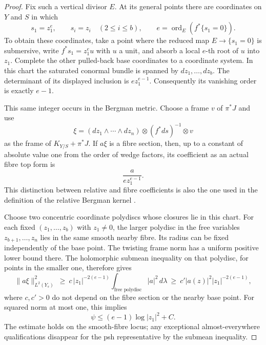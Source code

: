 \begin{proof}
Fix such a vertical divisor $E$.  At its general points there are
coordinates on $Y$ and $S$ in which
\begin{equation}\label{eq:h:slope:power-map}
 s_1=z_1^e,\qquad s_i=z_i\quad(2\leq i\leq b),
 \qquad e=\operatorname{ord}_E(f^*\{s_1=0\}).
\end{equation}
To obtain these coordinates, take a point where the reduced map
$E\to\{s_1=0\}$ is submersive, write $f^*s_1=z_1^e u$ with $u$ a
unit, and absorb a local $e$-th root of $u$ into $z_1$.  Complete the
other pulled-back base coordinates to a coordinate system.  In this
chart the saturated conormal bundle is spanned by
$dz_1,\ldots,dz_b$.  The determinant of its displayed inclusion is
$e z_1^{e-1}$.  Consequently its vanishing order is exactly $e-1$.

This same integer occurs in the Bergman metric.  Choose a frame $v$
of $\pi^*J$ and use
\[
  \xi=(dz_1\wedge\cdots\wedge dz_n)\otimes(f^*ds)^{-1}\otimes v
\]
as the frame of $K_{Y/S}+\pi^*J$.  If $a\xi$ is a fibre section,
then, up to a constant of absolute value one from the order of wedge
factors, its coefficient as an actual fibre top form is
\[
                       \frac{a}{e z_1^{e-1}}.
\]
This distinction between relative and fibre coefficients is also the
one used in the definition of the relative Bergman kernel
\cite[Section~1]{BerndtssonPaun2008}.

Choose two concentric coordinate polydiscs whose closures lie in this
chart.  For each fixed $(z_1,\ldots,z_b)$ with $z_1\ne0$, the larger
polydisc in the free variables $z_{b+1},\ldots,z_n$ lies in the same
smooth nearby fibre.  Its radius can be fixed independently of the
base point.  The twisting frame norm has a uniform positive lower
bound there.  The holomorphic submean inequality on that polydisc,
for points in the smaller one, therefore gives
\[
 \|a\xi\|_{L^2(Y_s)}^2
 \ \geq\ c\,|z_1|^{-2(e-1)}
       \int_{\text{free polydisc}}|a|^2\,d\lambda
 \ \geq\ c'|a(z)|^2|z_1|^{-2(e-1)},
\]
where $c,c'>0$ do not depend on the fibre section or the nearby base
point.  For squared norm at most one, this implies
\begin{equation}\label{eq:h:slope:bergman-order}
                    \psi\leq(e-1)\log|z_1|^2+C.
\end{equation}
The estimate holds on the smooth-fibre locus; any exceptional
almost-everywhere qualifications disappear for the psh representative
by the submean inequality.


\end{proof}
